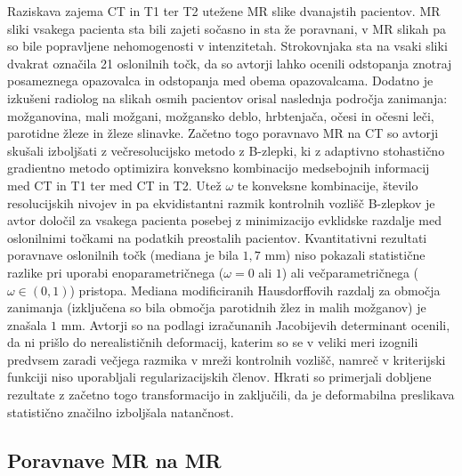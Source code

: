 \documentclass[journal]{IEEEtran}
\begin{document}
Raziskava \cite{fortunati2014} zajema CT in T1 ter T2 utežene MR slike dvanajstih pacientov. MR sliki vsakega pacienta sta bili zajeti sočasno in sta že poravnani, v MR slikah pa so bile popravljene nehomogenosti v intenzitetah. Strokovnjaka sta na vsaki sliki dvakrat označila 21 oslonilnih točk, da so avtorji lahko ocenili odstopanja znotraj posameznega opazovalca in odstopanja med obema opazovalcama. Dodatno je izkušeni radiolog na slikah osmih pacientov orisal naslednja področja zanimanja: možganovina, mali možgani, možgansko deblo, hrbtenjača, očesi in očesni leči, parotidne žleze in žleze slinavke. Začetno togo poravnavo MR na CT so avtorji skušali izboljšati z večresolucijsko metodo z B-zlepki, ki z adaptivno stohastično gradientno metodo optimizira konveksno kombinacijo medsebojnih informacij med CT in T1 ter med CT in T2. Utež $\omega$ te konveksne kombinacije, število resolucijskih nivojev in pa ekvidistantni razmik kontrolnih vozlišč B-zlepkov je avtor določil za vsakega pacienta posebej z minimizacijo evklidske razdalje med oslonilnimi točkami na podatkih preostalih pacientov. Kvantitativni rezultati poravnave oslonilnih točk (mediana je bila $1{,}7$ mm) niso pokazali statistične razlike pri uporabi enoparametričnega ($\omega = 0$ ali $1$) ali večparametričnega ($\omega\in(0,1)$) pristopa. Mediana modificiranih Hausdorffovih razdalj za območja zanimanja (izključena so bila območja parotidnih žlez in malih možganov) je znašala $1$ mm. Avtorji so na podlagi izračunanih Jacobijevih determinant ocenili, da ni prišlo do nerealističnih deformacij, katerim so se v veliki meri izognili predvsem zaradi večjega razmika v mreži kontrolnih vozlišč, namreč v kriterijski funkciji niso uporabljali regularizacijskih členov. Hkrati so primerjali dobljene rezultate z začetno togo transformacijo in zaključili, da je deformabilna preslikava statistično značilno izboljšala natančnost.

\subsection{Poravnave MR na MR}
\end{document}
